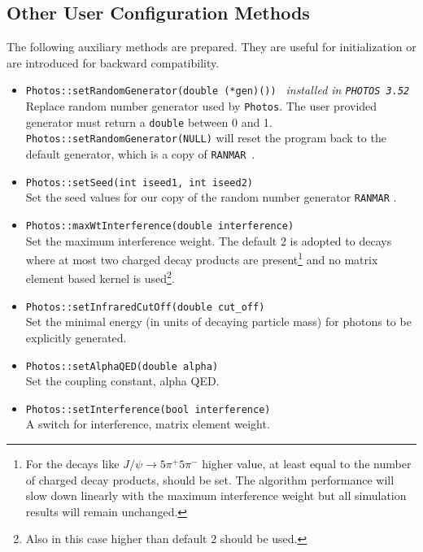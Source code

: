 \documentclass[]{Photos_interface_design}
\begin{document}
\subsection{Other User Configuration Methods}
\label{subsection:other_methods}

The following auxiliary methods are prepared. They are useful for initialization 
or are introduced for backward compatibility.

\begin{itemize}
  \item {\tt Photos::setRandomGenerator(double (*gen)()) } {\it  installed in {\tt PHOTOS 3.52}}\\
        Replace random number generator used by {\tt Photos}.
        The user provided generator   must return a {\tt double} between 0 and 1. 
        {\tt Photos::setRandomGenerator(NULL)} will reset the program back to  
        the default generator, which is a copy of {\tt RANMAR}~\cite{James:1988vf,marsaglia:1987}.
  \item {\tt Photos::setSeed(int iseed1, int iseed2)} \\
        Set the  seed values for our copy of the random number generator {\tt RANMAR} \cite{James:1988vf,marsaglia:1987}.
  \item {\tt Photos::maxWtInterference(double interference)} \\
        Set the maximum interference weight. The default 2 is adopted to decays where at most two charged decay products
        are present\footnote{For 
        the decays like $J/\psi \to 5\pi^+ 5\pi^-$ higher value, at least equal to the number of charged decay 
        products, should be set. The algorithm performance will slow down linearly with the  maximum interference weight but all 
        simulation results will remain unchanged.   
        } and no matrix element based kernel is used\footnote{Also in this case higher  than default 2 should be used.}.
  \item {\tt Photos::setInfraredCutOff(double cut\_off)} \\
        Set the minimal energy (in units of decaying particle mass)
        for photons to be explicitly generated.
  \item {\tt Photos::setAlphaQED(double alpha)} \\
        Set the coupling constant, alpha QED.
  \item {\tt Photos::setInterference(bool interference)} \\
        A switch for interference, matrix element weight.

\end{itemize}
\end{document}
